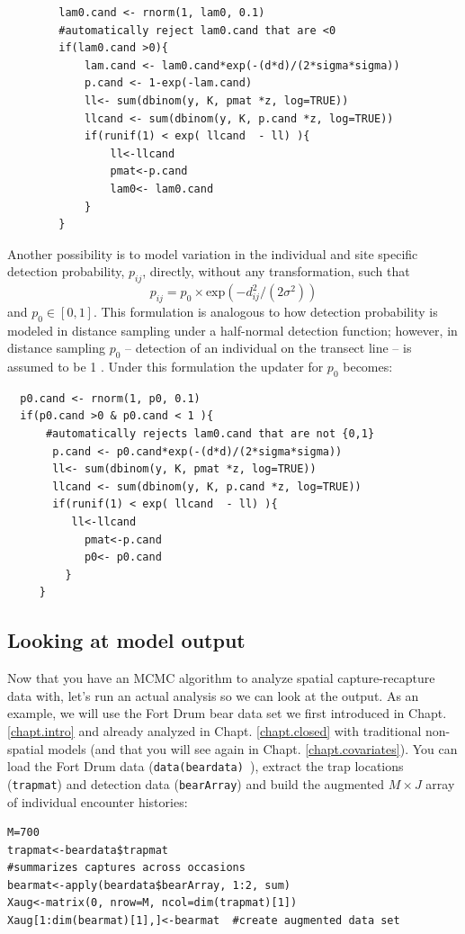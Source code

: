 \begin{verbatim}
        lam0.cand <- rnorm(1, lam0, 0.1)
        #automatically reject lam0.cand that are <0
        if(lam0.cand >0){
            lam.cand <- lam0.cand*exp(-(d*d)/(2*sigma*sigma))
            p.cand <- 1-exp(-lam.cand)
            ll<- sum(dbinom(y, K, pmat *z, log=TRUE))
            llcand <- sum(dbinom(y, K, p.cand *z, log=TRUE))
            if(runif(1) < exp( llcand  - ll) ){
                ll<-llcand
                pmat<-p.cand
                lam0<- lam0.cand
            }
        }
\end{verbatim}

Another possibility is to model variation in the individual and site
specific detection probability,  $p_{ij}$, directly, without any
transformation, such that
\[
p_{ij} = p_0 \times \mbox{exp}(-d_{ij}^2/(2\sigma^2))
\]
and $p_0 \in [0,1]$.
This formulation is analogous to how detection probability is modeled
in distance sampling under a half-normal detection function; however,
in distance sampling $p_0$ -- detection of an individual on the transect
line -- is assumed to be 1 \citep{buckland_etal:2001}. Under this
formulation the updater for $p_0$ becomes:

\begin{verbatim}
  p0.cand <- rnorm(1, p0, 0.1)
  if(p0.cand >0 & p0.cand < 1 ){
      #automatically rejects lam0.cand that are not {0,1}
       p.cand <- p0.cand*exp(-(d*d)/(2*sigma*sigma))
       ll<- sum(dbinom(y, K, pmat *z, log=TRUE))
       llcand <- sum(dbinom(y, K, p.cand *z, log=TRUE))
       if(runif(1) < exp( llcand  - ll) ){
          ll<-llcand
            pmat<-p.cand
            p0<- p0.cand
         }
     }
\end{verbatim}


\subsection{Looking at model output}
\label{mcmc.subsec.output}
Now that you have an MCMC algorithm to analyze spatial capture-recapture
data with, let's run an actual analysis so we can look at the output. As
an example, we will use the Fort Drum
bear data set we first introduced in Chapt. \ref{chapt.intro} and already analyzed in Chapt. \ref{chapt.closed} with
traditional non-spatial models (and that you will see again in Chapt.
\ref{chapt.covariates}). You can load the Fort Drum data
(\mbox{\tt data(beardata) }), extract the
trap locations (\mbox{\tt trapmat}) and
detection data (\mbox{\tt bearArray}) and build the augmented $M \times J$ array of individual
encounter histories:
\begin{verbatim}
M=700
trapmat<-beardata$trapmat
#summarizes captures across occasions
bearmat<-apply(beardata$bearArray, 1:2, sum)
Xaug<-matrix(0, nrow=M, ncol=dim(trapmat)[1])
Xaug[1:dim(bearmat)[1],]<-bearmat  #create augmented data set
\end{verbatim}

